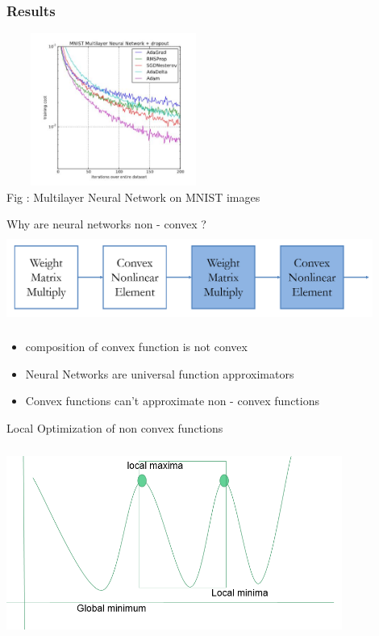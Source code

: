 \documentclass{beamer}
\begin{document}
\begin{frame}
 \frametitle{Results}
 \begin{center}
 \includegraphics[width=7cm,height=5cm,angle=0]{mlp} \\
 Fig : Multilayer Neural Network on MNIST images
 \end{center}
\end{frame}

\begin{frame}{Why are neural networks non - convex ?}
 \includegraphics[width=12cm,height=3cm,angle=0]{nn}  \\
 \begin{itemize}
     \item composition of convex function is not convex
     \item Neural Networks are universal function approximators
     \item Convex functions can't approximate non - convex functions
 \end{itemize}
\end{frame}

\begin{frame}{Local Optimization of non convex functions}
    \includegraphics[width=11cm,height=7cm,angle=0]{nonconv}
\end{frame}
\end{document}
